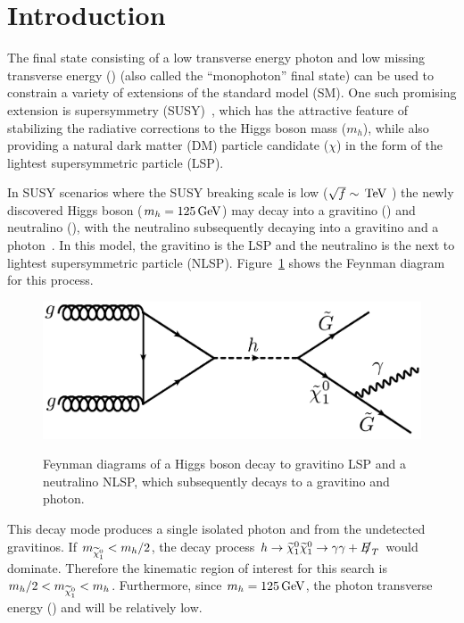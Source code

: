 \section{Introduction}

The final state consisting of a low transverse energy photon and low missing transverse energy (\met) (also called the ``monophoton'' final state) can be used to constrain a variety of extensions of the standard model (SM). One such promising extension is supersymmetry (SUSY)~\cite{GGMa,GGMd2,GGMd3,GGMd4,GGMd5,GGMd1,GGMd}, which has the attractive feature of stabilizing the radiative corrections to the Higgs boson mass ($m_{h}$), while also providing a natural dark matter (DM) particle candidate ($\chi$) in the form of the lightest supersymmetric particle (LSP). 

In SUSY scenarios where the SUSY breaking scale is low ($\sqrt{f} \sim \,\text{Te\hspace{-.08em}V}$ ) the newly discovered Higgs boson ($m_h = 125 \,\text{Ge\hspace{-.08em}V}$) \cite{cmshiggs,atlashiggs} may decay into a gravitino (\PXXSG) and neutralino (\PSGczDo), with the neutralino subsequently decaying into a gravitino and a photon~\cite{Petersson:2012dp}. In this model, the gravitino is the LSP and the neutralino is the next to lightest supersymmetric particle (NLSP). Figure~\ref{fig:feynman} shows the Feynman diagram for this process. 


\begin{figure}[!hp]
\centering
{\includegraphics[width=0.55\columnwidth]{figures/susy_feynman}}
\caption{Feynman diagrams of a Higgs boson decay to gravitino LSP and a neutralino NLSP, which subsequently decays to a gravitino and photon.
}
\label{fig:feynman}
\end{figure}

This decay mode produces a single isolated photon and \met from the undetected gravitinos. If $m_{\widetilde{\chi}^{0}_{1}} < m_{h}/2$, the decay process $h \to \PSGczDo \PSGczDo \to \gamma \gamma + \met$ would dominate. Therefore the kinematic region of interest for this search is $m_{h}/2 < m_{\widetilde{\chi}^{0}_{1}} < m_{h}$. Furthermore, since $m_{h} = 125 \,\text{Ge\hspace{-.08em}V}$, the photon transverse energy (\etg) and \met will be relatively low. 

